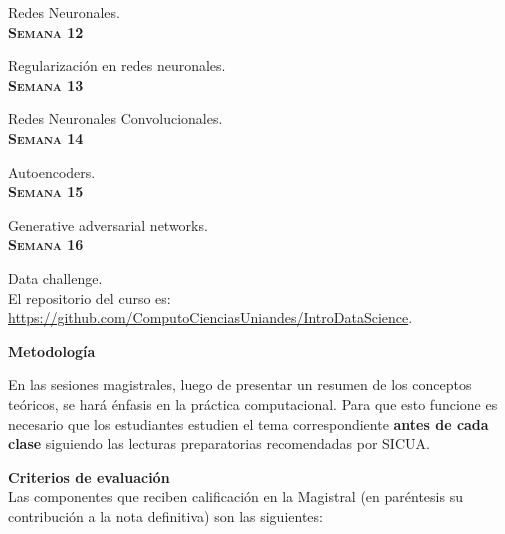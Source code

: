 \documentclass[letterpaper,10pt,onecolumn]{article}
\begin{document}
Redes Neuronales. 
\\[-0.3cm]

\noindent\textbf{\textsc{Semana 12}}

Regularizaci\'on en redes neuronales. 
\\[-0.3cm]


\noindent\textbf{\textsc{Semana 13}}

Redes Neuronales Convolucionales. 
\\[-0.3cm]

\noindent\textbf{\textsc{Semana 14}}

Autoencoders. %
\\[-0.3cm]

\noindent\textbf{\textsc{Semana 15}}

Generative adversarial networks.
\\[-0.3cm]

\noindent\textbf{\textsc{Semana 16}}

Data challenge.
\\[0.1cm]


El repositorio del curso es:
\url{https://github.com/ComputoCienciasUniandes/IntroDataScience}.

\vspace*{0.5cm} 
\noindent\textbf{\large {} \quad
  Metodolog\'ia}\\[-0.2cm] 


\noindent\normalsize 

En las sesiones magistrales, luego de presentar un resumen de
los conceptos te\'oricos, se har\'a \'enfasis en la pr\'actica computacional.
Para que esto funcione es necesario que los estudiantes estudien el
tema correspondiente {\bf antes de cada clase} siguiendo las lecturas
preparatorias recomendadas por SICUA.

\vspace*{0.5cm} 
\noindent\textbf{\large {} \quad Criterios de
  evaluaci\'on}\\[-0.2cm] 

Las componentes que reciben calificaci\'on en la Magistral (en
par\'entesis su contribuci\'on a la nota definitiva) son las
siguientes:  
\end{document}
